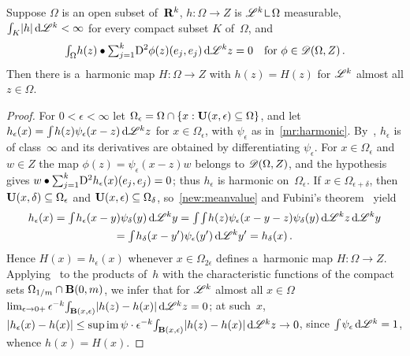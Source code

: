 \begin{lemma}[new]
    \label{new:weyl}
    Suppose $\Omega$ is an open subset of~$\mathbf{R}^{k}$, $h : \Omega \to Z$ is $\LM^{\vdim}
    \restrict \Omega$ measurable, ${\textstyle\int_{K}^{}} |h| \,\mathrm{d} \mathscr{L}^{k} < \infty$ for every compact
    subset $K$ of~$\Omega$, and
    \begin{displaymath}
        {\textstyle\int_{\Omega}^{}} h(z) \bullet {\textstyle\sum_{j=1}^{k}} \mathrm{D}^2 \phi(z)(e_j,e_j) \,\mathrm{d} \mathscr{L}^{k} z
        = 0 \quad \text{for $\phi \in \mathscr{D}(\Omega,Z)$} \,.
    \end{displaymath}
    Then there is a~harmonic map $H : \Omega \to Z$ with $h(z) = H(z)$ for $\mathscr{L}^{k}$ almost all
    $z \in \Omega$.
\end{lemma}

\begin{proof}
    For $0 < \epsilon < \infty$ let $\Omega_\epsilon = \Omega \cap \{ x : \mathbf{U}(x,\epsilon)
    \subseteq \Omega \}$, and let $h_\epsilon(x) = {\textstyle\int_{}^{}} h(z) \psi_\epsilon(x - z) \,\mathrm{d}
    \mathscr{L}^{k} z$ for $x \in \Omega_\epsilon$, with $\psi_\epsilon$ as in~\ref{mr:harmonic}. By~\cite[4.1.2]{Federer1969}, $h_\epsilon$ is
    of class~$\infty$ and its derivatives are obtained by differentiating $\psi_\epsilon$. For $x \in
    \Omega_\epsilon$ and $w \in Z$ the map $\phi(z) = \psi_\epsilon(x - z) w$ belongs to
    $\mathscr{D}(\Omega,Z)$, and the hypothesis gives $w \bullet {\textstyle\sum_{j=1}^{k}} \mathrm{D}^2
    h_\epsilon(x)(e_j,e_j) = 0$; thus $h_\epsilon$ is harmonic on~$\Omega_\epsilon$. If $x \in
    \Omega_{\epsilon + \delta}$, then $\mathbf{U}(x,\delta) \subseteq \Omega_\epsilon$ and
    $\mathbf{U}(x,\epsilon) \subseteq \Omega_\delta$, so~\ref{new:meanvalue} and Fubini's
    theorem~\cite[2.6.2]{Federer1969} yield
    \begin{multline*}
        h_\epsilon(x) = {\textstyle\int_{}^{}} h_\epsilon(x - y) \psi_\delta(y) \,\mathrm{d} \mathscr{L}^{k} y =
        {\textstyle\int_{}^{}} {\textstyle\int_{}^{}} h(z) \psi_\epsilon(x - y - z) \psi_\delta(y) \,\mathrm{d} \mathscr{L}^{k} z \,\mathrm{d}
        \mathscr{L}^{k} y \\ = {\textstyle\int_{}^{}} h_\delta(x - y') \psi_\epsilon(y') \,\mathrm{d} \mathscr{L}^{k} y' =
        h_\delta(x) \,.
    \end{multline*}
    Hence $H(x) = h_\epsilon(x)$ whenever $x \in \Omega_{2 \epsilon}$ defines a~harmonic map $H :
    \Omega \to Z$. Applying~\cite[2.8.9, 2.8.18, 2.9.9]{Federer1969} to the products of~$h$ with the
    characteristic functions of the compact sets $\Omega_{1/m} \cap \mathbf{B}(0,m)$, we infer that for
    $\mathscr{L}^{k}$ almost all $x \in \Omega$ $\lim_{\epsilon \to 0+} \epsilon^{-k} {\textstyle\int_{\mathbf{B}(x,\epsilon)}^{}} |h(z) -
    h(x)| \,\mathrm{d} \mathscr{L}^{k} z = 0$; at such~$x$, $|h_\epsilon(x) - h(x)| \le \sup \operatorname{im} \psi \cdot
    \epsilon^{-k} {\textstyle\int_{\mathbf{B}(x,\epsilon)}^{}} |h(z) - h(x)| \,\mathrm{d} \mathscr{L}^{k} z \to 0$, since
    ${\textstyle\int_{}^{}} \psi_\epsilon \,\mathrm{d} \mathscr{L}^{k} = 1$, whence $h(x) = H(x)$.
\end{proof}

